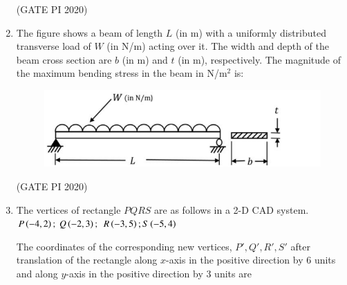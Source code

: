\documentclass[journal,12pt,onecolumn]{IEEEtran}
\theoremstyle{remark}
\begin{document}
\begin{enumerate}
\begin{enumerate}
\setlength{\itemsep}{0.5em}
\end{enumerate}

\hfill (GATE PI 2020)

\item The figure shows a beam of length $L$ (in m) with a uniformly distributed transverse load of $W$ (in N/m) acting over it. The width and depth of the beam cross section are $b$ (in m) and $t$ (in m), respectively. The magnitude of the maximum bending stress in the beam in N/m$^2$ is:

\begin{figure}[H]
    \centering
    \includegraphics[width=0.5\columnwidth]{figs/fig12.png}
    \caption{}
    \label{fig:placeholder}
\end{figure}

\begin{enumerate}
\setlength{\itemsep}{0.5em}
\end{enumerate}


\hfill (GATE PI 2020)

\item The vertices of rectangle $PQRS$ are as follows in a 2-D CAD system.
$P\left(-4,2\right);\ Q\left(-2,3\right); $
$ R\left(-3,5\right);S\left(-5,4\right)$

The coordinates of the corresponding new vertices, $P', Q', R', S'$ after translation of the rectangle along $x$-axis in the positive direction by $6$ units and along $y$-axis in the positive direction by $3$ units are


\end{enumerate}
\end{document}
